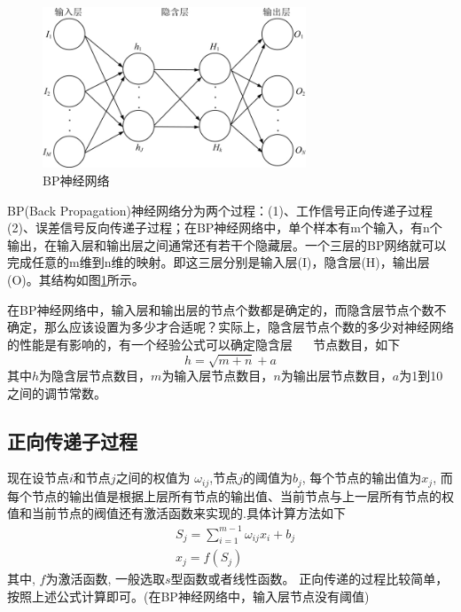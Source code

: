 \documentclass[UTF8,a4paper,10pt,nocolorlinks]{ctexart}
\begin{document}
    \begin{figure}[H]
            \centering %
            \includegraphics[width=0.7\textwidth]{BP.jpg} %
            \caption{BP神经网络}
            \label{BP}
    \end{figure}
    BP(Back Propagation)神经网络分为两个过程：(1)、工作信号正向传递子过程 (2)、误差信号反向传递子过程；在BP神经网络中，单个样本有m个输入，有n个输出，在输入层和输出层之间通常还有若干个隐藏层。一个三层的BP网络就可以完成任意的m维到n维的映射。即这三层分别是输入层(I)，隐含层(H)，输出层(O)。其结构如图\ref{BP}所示。
    \par 在BP神经网络中，输入层和输出层的节点个数都是确定的，而隐含层节点个数不确定，那么应该设置为多少才合适呢？实际上，隐含层节点个数的多少对神经网络的性能是有影响的，有一个经验公式可以确定隐含层    
       节点数目，如下
        \begin{equation} %
            h =\sqrt{m + n} + a \nonumber
        \end{equation}
    其中$h$为隐含层节点数目，$m$为输入层节点数目，$n$为输出层节点数目，$a$为1到10之间的调节常数。


    \subsection{正向传递子过程}
    现在设节点$i$和节点$j$之间的权值为 $\omega_{ij}$,节点$j$的阈值为$b_{j}$, 每个节点的输出值为$x_{j}$, 而每个节点的输出值是根据上层所有节点的输出值、当前节点与上一层所有节点的权值和当前节点的阀值还有激活函数来实现的.具体计算方法如下
    \begin{equation} %
        \begin{aligned}
        & S_j =\sum\limits_{i=1}^{m-1} \omega_{ij}x_{i} + b_{j} \nonumber \\
        & x_{j}=f(S_{j})
        \end{aligned}
    \end{equation}
    其中, $f$为激活函数, 一般选取$s$型函数或者线性函数。
    正向传递的过程比较简单，按照上述公式计算即可。(在BP神经网络中，输入层节点没有阈值)
\end{document}
